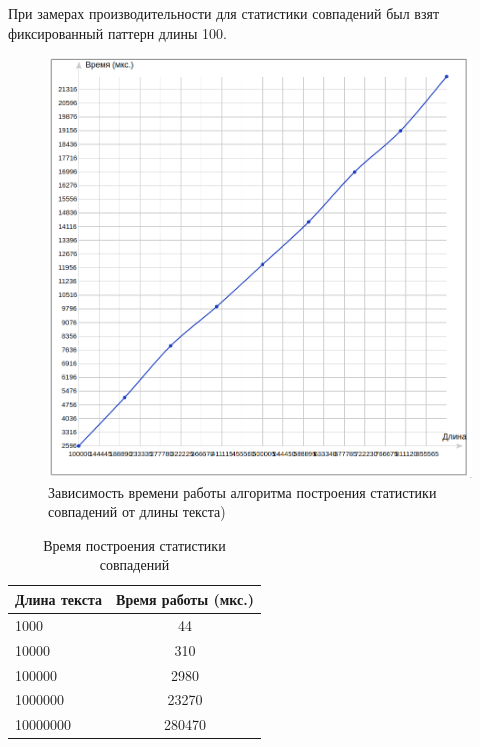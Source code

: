 \documentclass[12pt]{article}
\begin{document}
При замерах производительности для статистики совпадений был взят фиксированный паттерн длины 100.

\begin{figure}[H]
  \caption{Зависимость времени работы алгоритма построения статистики совпадений от длины текста)}
  \centering
       \includegraphics[width=\linewidth]{ms.png}
\end{figure}

\begin{table}[h]
\caption{Время построения статистики совпадений}
\label{tabular:timesandtenses}
\begin{center}
\begin{tabular}{|l|c|}
\hline
\textbf{Длина текста} & \textbf{Время работы (мкс.)} \\
\hline
1000 & 44 \\
\hline
10000 & 310 \\
\hline
100000 & 2980 \\
\hline
1000000 & 23270 \\
\hline
10000000 & 280470 \\
\hline
\end{tabular}
\end{center}
\end{table}

\end{document}
